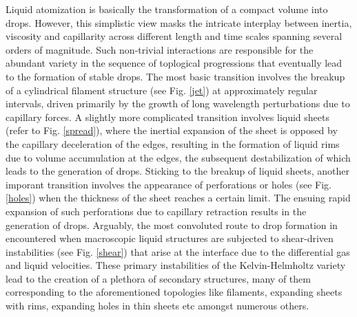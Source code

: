 Liquid atomization is basically the transformation of a compact volume into drops.
However, this simplistic view masks the intricate interplay between inertia, viscosity and capillarity across 
different length and time scales spanning several orders of magnitude.  
Such non-trivial interactions are responsible for the abundant variety in the sequence 
of toplogical progressions that eventually lead to the formation of stable drops. 
The most basic transition involves the breakup of a cylindrical filament structure 
(see Fig. \ref{jet}) at approximately regular intervals, driven primarily by the 
growth of long wavelength perturbations due to capillary forces. 
A slightly more complicated transition involves liquid sheets (refer to Fig. \ref{spread}), 
where the inertial expansion of the sheet is opposed by the capillary deceleration of the edges,
resulting in the formation of liquid rims due to volume accumulation at the edges, 
the subsequent destabilization of which leads to the generation of drops. 
Sticking to the breakup of liquid sheets, another imporant transition involves the  
appearance of perforations or holes (see Fig. \ref{holes}) when the thickness of the sheet reaches a certain limit. 
The ensuing rapid expansion of such perforations due to capillary retraction results in the generation of drops. 
Arguably, the most convoluted route to drop formation in encountered when macroscopic 
liquid structures are subjected to shear-driven instabilities (see Fig. \ref{shear}) that 
arise at the interface due to the differential gas and liquid velocities. 
These primary instabilities of the Kelvin-Helmholtz \cite{khi} variety lead to the creation 
of a plethora of secondary structures, many of them corresponding to the aforementioned 
topologies like filaments, expanding sheets with rims, expanding holes in thin sheets etc amongst numerous others. 


